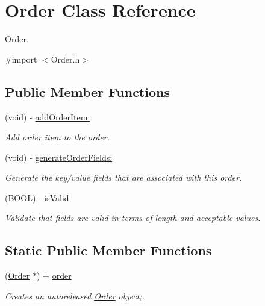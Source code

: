 \hypertarget{interface_order}{
\section{Order Class Reference}
\label{interface_order}
}


\hyperlink{interface_order}{Order}.  




{\ttfamily \#import $<$Order.h$>$}

\subsection*{Public Member Functions}
\begin{DoxyCompactItemize}
\item 
(void) -\/ \hyperlink{interface_order_af08f1241eace99b8743436ef5e05af51}{addOrderItem:}
\begin{DoxyCompactList}\small\item\em Add order item to the order. \item\end{DoxyCompactList}\item 
(void) -\/ \hyperlink{interface_order_ad9d564cf510219a4a5a691011d88e793}{generateOrderFields:}
\begin{DoxyCompactList}\small\item\em Generate the key/value fields that are associated with this order. \item\end{DoxyCompactList}\item 
(BOOL) -\/ \hyperlink{interface_order_a4e1844ebd0c45251541c60f23c86fcfd}{isValid}
\begin{DoxyCompactList}\small\item\em Validate that fields are valid in terms of length and acceptable values. \item\end{DoxyCompactList}\end{DoxyCompactItemize}
\subsection*{Static Public Member Functions}
\begin{DoxyCompactItemize}
\item 
(\hyperlink{interface_order}{Order} $\ast$) + \hyperlink{interface_order_a00c0c216f85788b8bbfdab9bada5cc63}{order}
\begin{DoxyCompactList}\small\item\em Creates an autoreleased \hyperlink{interface_order}{Order} object;. \item\end{DoxyCompactList}\end{DoxyCompactItemize}
